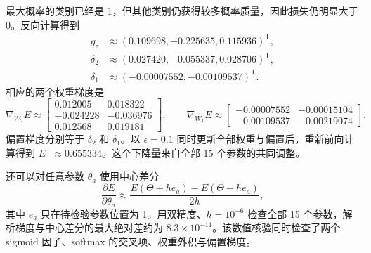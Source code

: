 最大概率的类别已经是 1，但其他类别仍获得较多概率质量，因此损失仍明显大于 0。反向计算得到
\begin{align}
 g_z&\approx(0.109698,-0.225635,0.115936)^{\mathsf T},\\
 \delta_2&\approx(0.027420,-0.055337,0.028706)^{\mathsf T},\\
 \delta_1&\approx(-0.00007552,-0.00109537)^{\mathsf T}.
\end{align}
相应的两个权重梯度是
\begin{equation}
 \nabla_{W_2}E\approx
 \begin{bmatrix}
 0.012005&0.018322\\
 -0.024228&-0.036976\\
 0.012568&0.019181
 \end{bmatrix},\qquad
 \nabla_{W_1}E\approx
 \begin{bmatrix}
 -0.00007552&-0.00015104\\
 -0.00109537&-0.00219074
 \end{bmatrix}.
\end{equation}
偏置梯度分别等于 $\delta_2$ 和 $\delta_1$。以 $\epsilon=0.1$ 同时更新全部权重与偏置后，重新前向计算得到 $E^+\approx0.655334$。这个下降量来自全部 15 个参数的共同调整。

还可以对任意参数 $\theta_a$ 使用中心差分
\begin{equation}
 \frac{\partial E}{\partial\theta_a}\approx
 \frac{E(\Theta+h e_a)-E(\Theta-h e_a)}{2h},
\end{equation}
其中 $e_a$ 只在待检验参数位置为 1。用双精度、$h=10^{-6}$ 检查全部 15 个参数，解析梯度与中心差分的最大绝对差约为 $8.3\times10^{-11}$。该数值核验同时检查了两个 sigmoid 因子、softmax 的交叉项、权重外积与偏置梯度。

